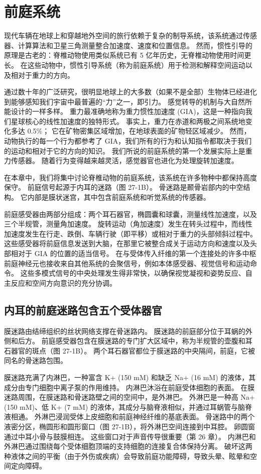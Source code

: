 \chapter{前庭系统} \label{chap:chap27}

现代车辆在地球上和穿越地外空间的旅行依赖于复杂的制导系统，该系统通过传感器、计算算法和卫星三角测量整合加速度、速度和位置信息。 然而，惯性引导的原理是古老的：脊椎动物使用类似系统已有 5 亿年历史，无脊椎动物使用时间更长。 在这些动物中，惯性引导系统（称为前庭系统）用于检测和解释空间运动以及相对于重力的方向。

通过数十年的广泛研究，很明显地球上的大多数（如果不是全部）生物体已经进化到能够感知我们宇宙中最普遍的“力”之一，即引力。 感觉转导的机制与大自然所能设计的一样多样。 重力最准确地称为重力惯性加速度 (GIA)，这是一种指向我们星球核心的线性加速度的独特形式。 事实上，重力在赤道和两极之间系统地变化多达 0.5\%； 它在矿物密集区域增加，在地球表面的矿物轻区域减少。 然而，动物执行的每一个行为都参考了 GIA，我们所有的行为和认知指令都取决于我们的运动和相对于它的方向的知识。 我们所说的前庭系统的第一个发展实际上是重力传感器。 随着行为变得越来越灵活，感觉器官也进化为处理旋转加速度。

在本章中，我们将集中讨论脊椎动物的前庭系统，该系统在许多物种中都保持高度保守。 前庭信号起源于内耳的迷路（图 27-1B）。 骨迷路是颞骨岩部内的中空结构。 它内部是膜状迷宫，其中包含前庭系统和听觉系统的传感器。

前庭感受器由两部分组成：两个耳石器官，椭圆囊和球囊，测量线性加速度，以及三个半规管，测量角加速度。 旋转运动（角加速度）发生在转头过程中，而线性加速度发生在行走、跌倒、车辆行驶（即平移）或相对于重力的头部倾斜过程中。 这些感受器将前庭信息发送到大脑，在那里它被整合成关于运动方向和速度以及头部相对于 GIA 的位置的适当信号。 在与受体传入纤维的第一个连接处的许多中枢前庭神经元也接收来自其他系统的会聚信号，例如本体感受器、视觉信号和运动命令。 这些多模式信号的中央处理发生得非常快，以确保视觉凝视和姿势反应、自主反应和空间方向意识的充分协调。

\section{内耳的前庭迷路包含五个受体器官}
膜迷路由结缔组织的丝状网络支撑在骨迷路内。 膜迷路的前庭部分位于耳蜗的外侧和后方。 前庭感受器包含在膜迷路的专门扩大区域中，称为半规管的壶腹和耳石器官的斑点（图 27-1B）。 两个耳石器官都位于膜迷路的中央隔间，前庭，它被同名的骨迷路包围。

膜迷路充满了内淋巴，一种富含 K+ (150 mM) 和缺乏 Na+ (16 mM) 的液体，其成分由专门细胞中离子泵的作用维持。 内淋巴沐浴在前庭受体细胞的表面。 在膜迷路周围，在膜迷路和骨迷路壁之间的空间中，是外淋巴。 外淋巴是一种高 Na+ (150 mM)、低 K+ (7 mM) 的液体，其成分与脑脊液相似，并通过耳蜗管与脑脊液相通。 外淋巴浸润受体上皮细胞和前庭神经纤维的基底表面。 骨迷路中的两个液密分区，椭圆形和圆形窗口（图 27-1B），将外淋巴空间连接到中耳腔。 卵圆窗通过中耳小骨与鼓膜相连。 这些窗口对于声音传导很重要（第 26 章）。 内淋巴和外淋巴通过围绕每个受体细胞顶端的支持细胞的连接复合体保持分离。 破坏这两种液体之间的平衡（由于外伤或疾病）会导致前庭功能障碍，导致头晕、眩晕和空间定向障碍。

